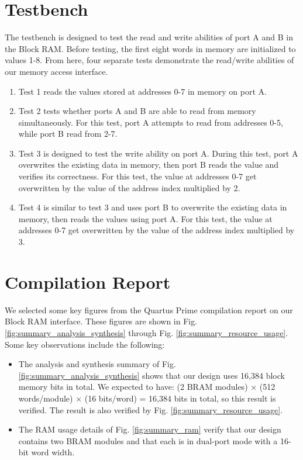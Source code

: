 \documentclass[conference]{IEEEtran}
\begin{document}
\section{Testbench}
The testbench is designed to test the read and write abilities of port A and B in the Block RAM. Before testing, the first eight words in memory are initialized to values 1-8. From here, four separate tests demonstrate the read/write abilities of our memory access interface.
\begin{enumerate}
    \item Test 1 reads the values stored at addresses 0-7 in memory on port A.
    \item Test 2 tests whether ports A and B are able to read from memory simultaneously. For this test, port A attempts to read from addresses 0-5, while port B read from 2-7.
    \item Test 3 is designed to test the write ability on port A. During this test, port A overwrites the existing data in memory, then port B reads the value and verifies its correctness. For this test, the value at addresses 0-7 get overwritten by the value of the address index multiplied by 2.
    \item Test 4 is similar to test 3 and uses port B to overwrite the existing data in memory, then reads the values using port A. For this test, the value at addresses 0-7 get overwritten by the value of the address index multiplied by 3.
\end{enumerate}

\section{Compilation Report}

We selected some key figures from the Quartus Prime compilation report on our Block RAM interface. These figures are shown in Fig. \ref{fig:summary_analysis_synthesis} through Fig. \ref{fig:summary_resource_usage}. Some key observations include the following:

\begin{itemize}
    \item The analysis and synthesis summary of Fig. \ref{fig:summary_analysis_synthesis} shows that our design uses 16,384 block memory bits in total. We expected to have: (2 BRAM modules) × (512 words/module) × (16 bits/word) = 16,384 bits in total, so this result is verified. The result is also verified by Fig. \ref{fig:summary_resource_usage}.
    \item The RAM usage details of Fig. \ref{fig:summary_ram} verify that our design contains two BRAM modules and that each is in dual-port mode with a 16-bit word width.
\end{itemize}
\end{document}
